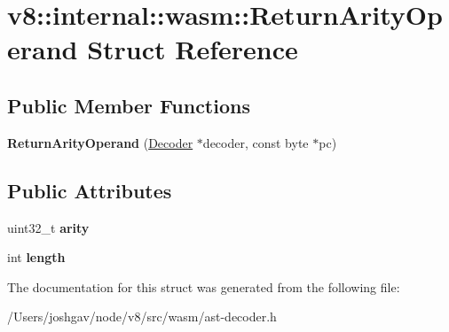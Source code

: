 \hypertarget{structv8_1_1internal_1_1wasm_1_1_return_arity_operand}{}\section{v8\+:\+:internal\+:\+:wasm\+:\+:Return\+Arity\+Operand Struct Reference}
\label{structv8_1_1internal_1_1wasm_1_1_return_arity_operand}
\subsection*{Public Member Functions}
\begin{DoxyCompactItemize}
\item 
{\bfseries Return\+Arity\+Operand} (\hyperlink{classv8_1_1internal_1_1wasm_1_1_decoder}{Decoder} $\ast$decoder, const byte $\ast$pc)\hypertarget{structv8_1_1internal_1_1wasm_1_1_return_arity_operand_aca326a6bdad8daddb6c9e5db72d56394}{}\label{structv8_1_1internal_1_1wasm_1_1_return_arity_operand_aca326a6bdad8daddb6c9e5db72d56394}

\end{DoxyCompactItemize}
\subsection*{Public Attributes}
\begin{DoxyCompactItemize}
\item 
uint32\+\_\+t {\bfseries arity}\hypertarget{structv8_1_1internal_1_1wasm_1_1_return_arity_operand_a1bdd36692d010e094ab6df1dc41480e0}{}\label{structv8_1_1internal_1_1wasm_1_1_return_arity_operand_a1bdd36692d010e094ab6df1dc41480e0}

\item 
int {\bfseries length}\hypertarget{structv8_1_1internal_1_1wasm_1_1_return_arity_operand_a2ecfa3dad0212a3e533f46f0530f07ce}{}\label{structv8_1_1internal_1_1wasm_1_1_return_arity_operand_a2ecfa3dad0212a3e533f46f0530f07ce}

\end{DoxyCompactItemize}


The documentation for this struct was generated from the following file\+:\begin{DoxyCompactItemize}
\item 
/\+Users/joshgav/node/v8/src/wasm/ast-\/decoder.\+h\end{DoxyCompactItemize}
